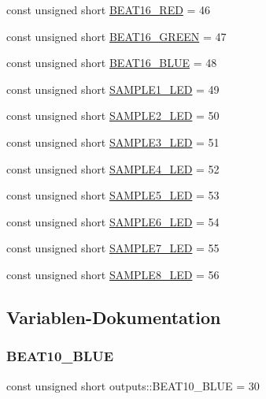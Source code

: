 \begin{DoxyCompactItemize}
\item 
const unsigned short \hyperlink{namespaceoutputs_a3dbc6b2fd920d581b752b72f86be3733}{B\+E\+A\+T16\+\_\+\+R\+ED} = 46
\item 
const unsigned short \hyperlink{namespaceoutputs_abb8efcc194a9934c26026a359edc8929}{B\+E\+A\+T16\+\_\+\+G\+R\+E\+EN} = 47
\item 
const unsigned short \hyperlink{namespaceoutputs_aaa4685feacdb3e8d2bb1c0435952e030}{B\+E\+A\+T16\+\_\+\+B\+L\+UE} = 48
\item 
const unsigned short \hyperlink{namespaceoutputs_a151156390f60151968f4092740d9d6b8}{S\+A\+M\+P\+L\+E1\+\_\+\+L\+ED} = 49
\item 
const unsigned short \hyperlink{namespaceoutputs_ae0776935fda36be3a645994d16591980}{S\+A\+M\+P\+L\+E2\+\_\+\+L\+ED} = 50
\item 
const unsigned short \hyperlink{namespaceoutputs_a8a0be2be0ae271cb8b57234a189b6689}{S\+A\+M\+P\+L\+E3\+\_\+\+L\+ED} = 51
\item 
const unsigned short \hyperlink{namespaceoutputs_a6fbee7a72f91577a7e1f072d00ad8d9f}{S\+A\+M\+P\+L\+E4\+\_\+\+L\+ED} = 52
\item 
const unsigned short \hyperlink{namespaceoutputs_a87e2d51fbeb2ac9fd23fc5d937b1c7c2}{S\+A\+M\+P\+L\+E5\+\_\+\+L\+ED} = 53
\item 
const unsigned short \hyperlink{namespaceoutputs_a7bdee2eb9fc676ac7edb9582334be15a}{S\+A\+M\+P\+L\+E6\+\_\+\+L\+ED} = 54
\item 
const unsigned short \hyperlink{namespaceoutputs_a3d438bc8ce91fb825bf2da7834ac639e}{S\+A\+M\+P\+L\+E7\+\_\+\+L\+ED} = 55
\item 
const unsigned short \hyperlink{namespaceoutputs_ac6e07c06d1d512716e6309db54648440}{S\+A\+M\+P\+L\+E8\+\_\+\+L\+ED} = 56
\end{DoxyCompactItemize}


\subsection{Variablen-\/\+Dokumentation}
\mbox{\label{namespaceoutputs_a188668f7db5d9610361658c817b08574}} 
\subsubsection{\texorpdfstring{B\+E\+A\+T10\+\_\+\+B\+L\+UE}{BEAT10\_BLUE}}
{\footnotesize\ttfamily const unsigned short outputs\+::\+B\+E\+A\+T10\+\_\+\+B\+L\+UE = 30}



